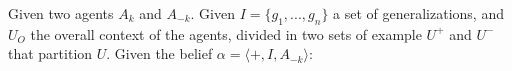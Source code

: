 Given two agents $A_{k}$ and $A_{-k}$. Given $I = \{ g_{1}, ..., g_{n} \}$ a set of generalizations, and $U_{O}$ the overall context of the agents, divided in two sets of example $U^{+}$ and $U^{-}$ that partition $U$. Given the belief $\alpha = \langle +, I, A_{-k} \rangle$:

\begin{lemma}

\end{lemma}